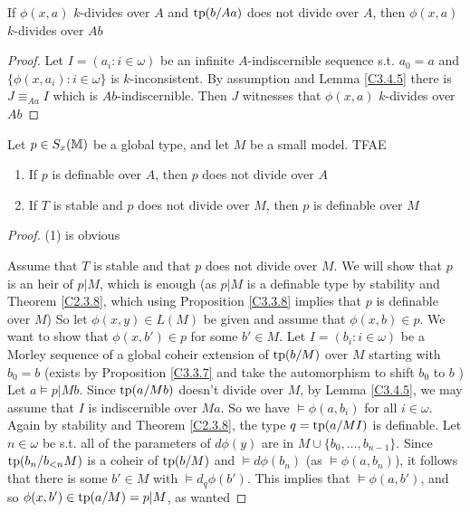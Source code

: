 \documentclass[11pt]{article}
\begin{document}
\begin{corollary}[]
\label{C3.4.7}
If \(\phi(x,a)\) \(k\)-divides over \(A\) and \(\operatorname{tp}(b/Aa)\) does not divide over \(A\),
then \(\phi(x,a)\) \(k\)-divides over \(Ab\)
\end{corollary}

\begin{proof}
Let \(I=(a_i:i\in\omega)\) be an infinite \(A\)-indiscernible sequence s.t. \(a_0=a\)
and \(\{\phi(x,a_i):i\in\omega\}\) is \(k\)-inconsistent. By assumption and Lemma \ref{C3.4.5} there
is \(J\equiv_{Aa}I\) which is \(Ab\)-indiscernible. Then \(J\) witnesses
that \(\phi(x,a)\) \(k\)-divides over \(Ab\)
\end{proof}

\begin{proposition}[]
\label{C3.4.8}
Let \(p\in S_x(\mathbb{M})\) be a global type, and let \(M\) be a small model. TFAE
\begin{enumerate}
\item If \(p\) is definable over \(A\), then \(p\) does not divide over \(A\)
\item If \(T\) is stable and \(p\) does not divide over \(M\), then \(p\) is definable over \(M\)
\end{enumerate}
\end{proposition}

\begin{proof}
(1) is obvious

Assume that \(T\) is stable and that \(p\) does not divide over \(M\).
We will show that \(p\) is an heir of \(p|M\), which is enough (as \(p|M\) is a definable type
by stability and Theorem \ref{C2.3.8}, which using Proposition \ref{C3.3.8} implies that \(p\) is
definable over \(M\))
So let \(\phi(x,y)\in L(M)\) be given and assume that \(\phi(x,b)\in p\). We want to show
that \(\phi(x,b')\in p\) for some \(b'\in M\).
Let \(I=(b_i:i\in\omega)\) be a Morley sequence of a global coheir extension of \(\operatorname{tp}(b/M)\) over \(M\)
starting with \(b_0=b\) (exists by Proposition \ref{C3.3.7} and take the automorphism to
shift \(b_0\) to \(b\) )
Let \(a\vDash p|Mb\). Since \(\operatorname{tp}(a/Mb)\) doesn't divide over \(M\), by Lemma \ref{C3.4.5}, we may
assume that \(I\) is indiscernible over \(Ma\).
So we have \(\vDash\phi(a,b_i)\) for all \(i\in\omega\). Again by stability and Theorem \ref{C2.3.8}, the
type \(q=\operatorname{tp}(a/MI)\) is definable. Let \(n\in\omega\) be s.t. all of the parameters of \(d\phi(y)\) are
in \(M\cup\{b_0,\dots,b_{n-1}\}\). Since \(\operatorname{tp}(b_n/b_{<n}M)\) is a coheir of \(\operatorname{tp}(b/M)\)
and \(\vDash d\phi(b_n)\) (as \(\vDash\phi(a,b_n)\)), it follows that there is some \(b'\in M\)
with \(\vDash d_q\phi(b')\). This implies that \(\vDash\phi(a,b')\), and so \(\phi(x,b')\in\operatorname{tp}(a/M)=p|M\), as wanted
\end{proof}
\end{document}
